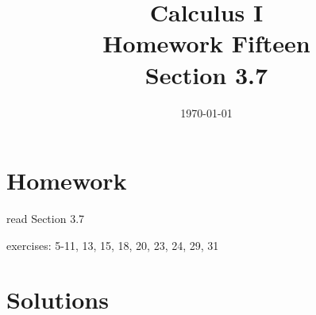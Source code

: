 \documentclass[letterpaper, landscape]{exam}
\title{Calculus I \\ Homework Fifteen \\ Section 3.7}
\author{}
\date{\today}
\begin{document}
  \maketitle

  \section{Homework}
    \begin{itemize*}
      \item read Section 3.7
      \item exercises: 5-11, 13, 15, 18, 20, 23, 24, 29, 31
    \end{itemize*}

  \ifprintanswers

  \section{Solutions}
\end{document}
